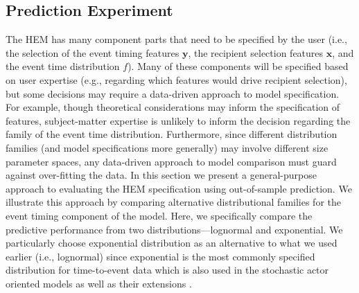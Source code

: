 \documentclass[12pt]{article}
\begin{document}
	\subsection{Prediction Experiment}\label{subsec:Experiment_email}
	
	The HEM has many component parts that need to be specified by the user (i.e., the selection of the event timing features $\bm{y}$, the recipient selection features $\bm{x}$, and the event time distribution $f$). Many of these components will be specified based on user expertise (e.g., regarding which features would drive recipient selection), but some decisions may require a data-driven approach to model specification. For example, though theoretical considerations may inform the specification of features, subject-matter expertise is unlikely to inform the decision regarding the family of the event time distribution. Furthermore, since different distribution families (and model specifications more generally) may involve different size parameter spaces, any data-driven approach to model comparison must guard against over-fitting the data. In this section we present a general-purpose approach to evaluating the HEM specification using out-of-sample prediction. We illustrate this approach by comparing alternative distributional families for the event timing component of the model. Here, we specifically compare the predictive performance from two distributions---lognormal and exponential. We particularly choose exponential distribution as an alternative to what we used earlier (i.e., lognormal) since exponential is the most commonly specified distribution for time-to-event data which is also used in the stochastic actor oriented models \citep{snijders1996stochastic} as well as their extensions \citep{snijders2007modeling}. 
\end{document}

